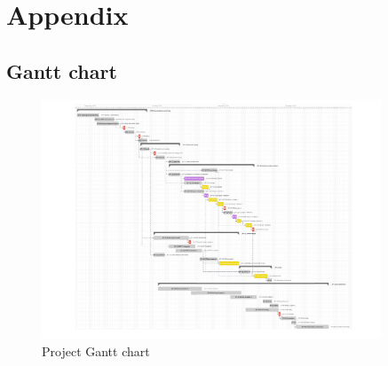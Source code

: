 \chapter{Appendix}



\clearpage

\addtolength{\hoffset}{-4.0cm}
\addtolength{\voffset}{2.5cm}
\recalctypearea


\section{Gantt chart}


\begin{figure}[H]
	\begin{center}
		\includegraphics[width=0.9\textwidth]{../Pictures/2018_10_05_Gantt_V2/GanttV2.pdf}
		\caption{Project Gantt chart}
		\label{gantt}
	\end{center}	
\end{figure}





\clearpage
\addtolength{\hoffset}{4.0cm}
\addtolength{\voffset}{-2.5cm}
\recalctypearea


